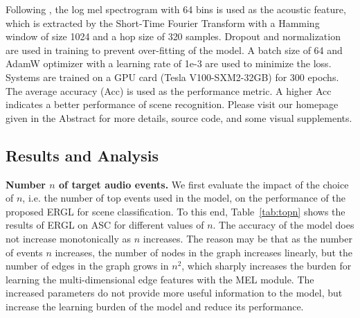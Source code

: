 \documentclass{article}
\begin{document}
Following \cite{kong2020panns}, the log mel spectrogram with 64 bins is used as the acoustic feature, which is extracted by the Short-Time Fourier Transform with a Hamming window of size 1024 and a hop size of 320 samples. 
Dropout and normalization are used in training to prevent over-fitting of the model. 
A batch size of 64 and AdamW optimizer \cite{adamw} with a learning rate of 1e-3 are used to minimize the loss. 
Systems are trained on a GPU card (Tesla V100-SXM2-32GB) for 300 epochs.
The average accuracy (Acc) \cite{acoustic_scene} is used as the performance metric.
A higher Acc indicates a better performance of scene recognition. 
Please visit our homepage given in the Abstract for more details, source code, and some visual supplements. 




\vspace{-0.2cm}
\subsection{Results and Analysis}

\vspace{-0.2cm}
\textbf{Number $n$ of target audio events.}
We first evaluate the impact of the choice of $n$, i.e.  the number of top events used in the model,  on the performance of the proposed ERGL for scene classification.
To this end, Table~\ref{tab:topn} shows the results of ERGL on ASC for different values of $n$.
The accuracy of the model does not increase monotonically as $n$ increases. 
The reason may be that as the number of events $n$ increases, the  number of nodes in the graph increases linearly, but the number of edges in the graph grows in $n^2$, which sharply increases the burden for learning the multi-dimensional edge features with the MEL module. 
The increased parameters do not provide more useful information to the model, but increase the learning burden of the model and reduce its performance.
\end{document}
